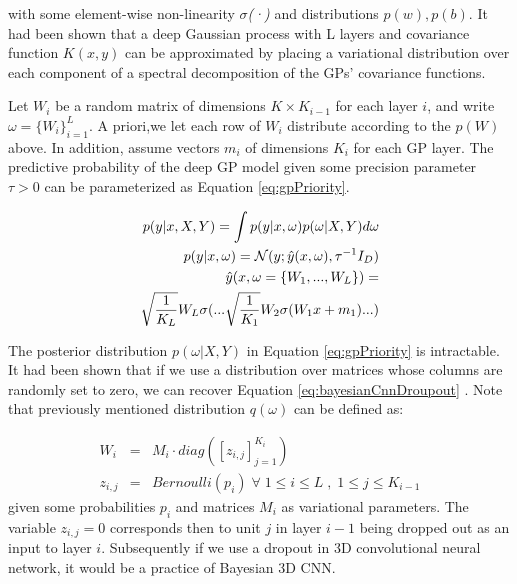 \documentclass[a4paper,fleqn]{cas-dc}
\begin{document}
with some element-wise non-linearity {\it $\sigma$(·)} and distributions $p(w), p(b)$. It had been shown that a deep Gaussian process with L layers and covariance function $K(x,y)$ can be approximated by placing a variational distribution over each component of a spectral decomposition of the GPs’ covariance functions.

Let $W_i$ be a random matrix of dimensions $K \times K_{i-1}$ for each layer $i$, and write
$\omega = \{ W_i \}^L_{i=1}$. A priori,we let each row of $W_i$ distribute according to the $p(W)$ above. In addition, assume vectors $m_i$ of dimensions $K_i$ for each GP layer. The predictive probability of the deep GP model given some precision parameter $\tau > 0$ can be parameterized as Equation \eqref{eq:gpPriority}.

\begin{eqnarray}
\label{eq:gpPriority}
p(y | x,X,Y) = \int p(y|x,\omega) p(\omega|X,Y)d\omega \\ 
p(y|x,\omega) = \mathcal{N} (y ; \hat{y} (x,\omega) , \tau^{-1} I_D )  \nonumber \\
\hat{y} (x, \omega = \{ W_1, ..., W_L \}) =  \nonumber \\
\sqrt{1 \over K_L} W_L \sigma( ...  \sqrt{1 \over K_1} W_2 \sigma( W_1 x + m_1 ) ... )  \nonumber
\end{eqnarray}

The posterior distribution $p(\omega|X,Y)$ in Equation \eqref{eq:gpPriority} is intractable. It had been shown that if we use a distribution over matrices whose columns are randomly set to zero, we can recover Equation \eqref{eq:bayesianCnnDroupout} \cite{Gal2016}. Note that previously mentioned distribution $q(\omega)$ can be defined as:

\begin{eqnarray}
W_i &=& M_i \cdot diag([ z_{i,j} ]^{K_i}_{j=1} ) \nonumber \\ 
z_{i,j} &=& Bernoulli(p_i) \; \forall \; 1 \le i \le L \; , \; 1 \le j \le K_{i-1} \nonumber
\end{eqnarray}
\newline
given some probabilities $p_i$ and matrices $M_i$ as variational parameters. The variable $z_{i,j} = 0$ corresponds then to unit $j$ in layer $i-1$ being dropped out as an input to layer $i$. Subsequently if we use a dropout in 3D convolutional neural network, it would be a practice of Bayesian 3D CNN.
\end{document}
